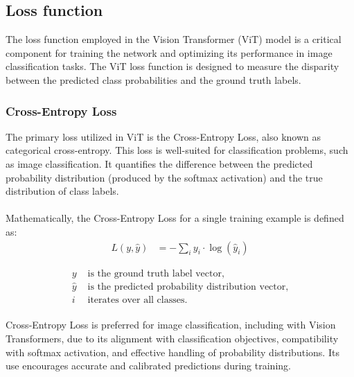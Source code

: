 \subsection{Loss function }
The loss function employed in the Vision Transformer (ViT) model is a critical component for training the network and optimizing its performance in image classification tasks. The ViT loss function is designed to measure the disparity between the predicted class probabilities and the ground truth labels.


\subsubsection{Cross-Entropy Loss}
The primary loss utilized in ViT is the Cross-Entropy Loss, also known as categorical cross-entropy. This loss is well-suited for classification problems, such as image classification. It quantifies the difference between the predicted probability distribution (produced by the softmax activation) and the true distribution of class labels.
\\
\\
Mathematically, the Cross-Entropy Loss for a single training example is defined as:
\\

\begin{align}
    L(y, \hat{y}) & = -\sum_i y_i \cdot \log(\hat{y}_i) \label{eq:loss_function}
\end{align}


\begin{align*}
    y       & \text{ is the ground truth label vector,}                 \\
    \hat{y} & \text{ is the predicted probability distribution vector,} \\
    i       & \text{ iterates over all classes.}
\end{align*}
\\
Cross-Entropy Loss is preferred for image classification, including with Vision Transformers, due to its alignment with classification objectives, compatibility with softmax activation, and effective handling of probability distributions. Its use encourages accurate and calibrated predictions during training.
